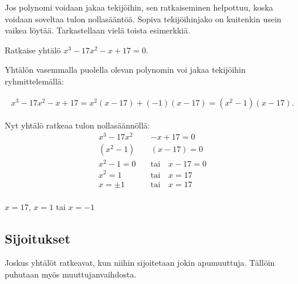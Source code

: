 Jos polynomi voidaan jakaa tekijöihin, sen ratkaiseminen helpottuu, koska voidaan soveltaa tulon nollasääntöä.
Sopiva tekijöihinjako on kuitenkin usein vaikea löytää. Tarkastellaan vielä toista esimerkkiä.

\begin{esimerkki}
Ratkaise yhtälö $x^3-17x^2-x+17 = 0$.

\begin{esimratk}
Yhtälön vasemmalla puolella olevan polynomin voi jakaa tekijöihin ryhmittelemällä:

\begin{align*}
x^3-17x^2-x+17=x^2(x-17)+(-1)(x-17)=(x^2-1)(x-17).
\end{align*}

Nyt yhtälö ratkeaa tulon nollasäännöllä:
\begin{align*}
x^3-17x^2&-x+17=0 \\
(x^2-1)&(x-17)=0 \\
x^2-1 = 0 \quad &\text{tai} \quad x - 17 = 0 \\
x^2 = 1 \quad &\text{tai} \quad x = 17 \\
x =\pm 1 \quad &\text{tai} \quad x = 17 \\
\end{align*}
\end{esimratk}

\begin{esimvast}
$x = 17$, $x = 1$ tai $x=-1$
\end{esimvast}
\end{esimerkki}

\subsection*{Sijoitukset}

Joskus yhtälöt ratkeavat, kun niihin sijoitetaan jokin apumuuttuja.
Tällöin puhutaan myös muuttujanvaihdosta.


